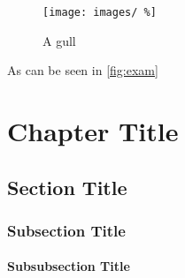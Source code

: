 \begin{figure}
\begin{center}
\texttt{[image: images/ \%]}
\end{center}
\caption{A gull}
\end{figure}

As can be seen in \cref{fig:exam}\\
\chapter{Chapter Title}
\label{ch:Chapter Title}

\section{Section Title}
\label{sec:Section Title}

\subsection{Subsection Title}
\label{subsec:Subsection Title}

\subsubsection{Subsubsection Title}
\label{bb:Subsubsection Title}





